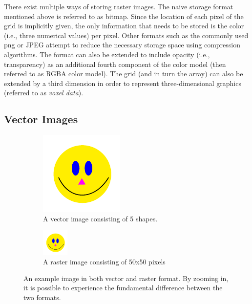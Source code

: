 There exist multiple ways of storing raster images. The naive storage format mentioned above is referred to as bitmap. Since the location of each pixel of the grid is implicitly given, the only information that needs to be stored is the color (i.e., three numerical values) per pixel. Other formats such as the commonly used \gls{png} \citep{RFC2083} or JPEG attempt to reduce the necessary storage space using compression algorithms. The format can also be extended to include opacity (i.e., transparency) as an additional fourth component of the color model (then referred to as RGBA color model). The grid (and in turn the array) can also be extended by a third dimension in order to represent three-dimensional graphics (referred to as \emph{voxel data}).

\subsection{Vector Images}
\label{subsec:bg.vector}

\begin{figure}[h]
\centering
\begin{subfigure}[b]{0.4\textwidth}
\centering
\includegraphics[]{graphics/vector_ex.pdf}
    \caption{A vector image consisting of 5 shapes.}
    \label{fig:vector-ex.vec}
\end{subfigure}
\hfill
\begin{subfigure}[b]{0.4\textwidth}
\centering
    \includegraphics{graphics/vector_ex.png}
    \caption{A raster image consisting of 50x50 pixels}
\end{subfigure}
    \caption{An example image in both vector and raster format. By zooming in, it is possible to experience the fundamental difference between the two formats.}
    \label{fig:vector-ex}
\end{figure}

